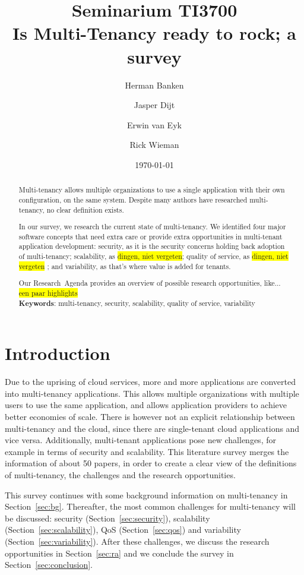 \documentclass{article}
\title{Seminarium TI3700\\ Is Multi-Tenancy ready to rock; a survey}
\author{Herman Banken\and
    Jasper Dijt\and
    Erwin van Eyk\and
    Rick Wieman}
\date{\today}
\newcommand{\highlight}[1]{\colorbox{yellow}{#1}}
\begin{document}
\maketitle
\thispagestyle{empty}

\begin{abstract}
Multi-tenancy allows multiple organizations to use a single application with their own configuration, on the same system. Despite many authors have researched multi-tenancy, no clear definition exists.

In our survey, we research the current state of multi-tenancy. We identified four major software concepts that need extra care or provide extra opportunities in multi-tenant application development: 
security, as it is the security concerns holding back adoption of multi-tenancy; %
scalability, as \highlight{dingen, niet vergeten};		%
quality of service, as \highlight{dingen, niet vergeten} ; 	%
and variability, as that's where value is added for tenants.  

Our Research~Agenda provides an overview of possible research opportunities, 
like... \highlight{een paar highlights}%
\\

\textbf{Keywords}: multi-tenancy, security, scalability, quality of service, variability
\end{abstract}

\section{Introduction}
Due to the uprising of cloud services, more and more applications are converted into multi-tenancy applications. 
This allows multiple organizations with multiple users to use the same application, and allows application providers to achieve better economies of scale. 
There is however not an explicit relationship between multi-tenancy and the cloud, since there are single-tenant cloud applications and vice versa. 
Additionally, multi-tenant applications pose new challenges, for example in terms of security and scalability. 
This literature survey merges the information of about 50 papers, in order to create a clear view of the definitions of multi-tenancy, the challenges and the research opportunities.

This survey continues with some background information on multi-tenancy in Section~\ref{sec:bg}. Thereafter, the most common challenges for multi-tenancy will be discussed: security (Section~\ref{sec:security}), scalability (Section~\ref{sec:scalability}), \ac{QoS} (Section~\ref{sec:qos}) and variability (Section~\ref{sec:variability}). After these challenges, we discuss the research opportunities in Section~\ref{sec:ra} and we conclude the survey in Section~\ref{sec:conclusion}. %
\end{document}
